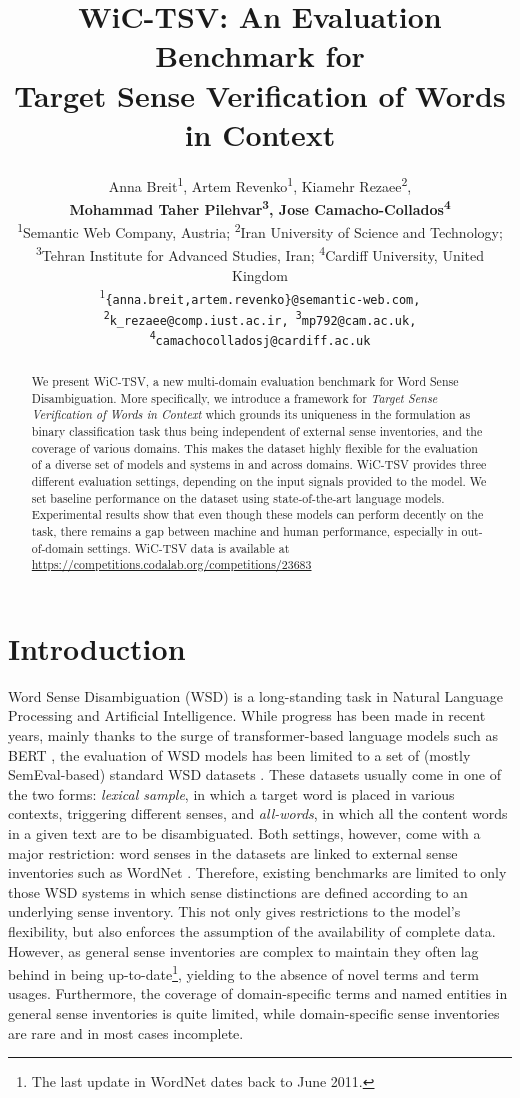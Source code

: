 \documentclass[11pt,a4paper]{article}
\title{WiC-TSV: An Evaluation Benchmark for \\ Target Sense Verification of Words in Context}
\author{Anna Breit\textsuperscript{1}, Artem Revenko\textsuperscript{1}, Kiamehr Rezaee\textsuperscript{2}, \\ \textbf{Mohammad Taher Pilehvar\textsuperscript{3}, Jose Camacho-Collados\textsuperscript{4}} \\
\textsuperscript{1}Semantic Web Company, Austria;
        \textsuperscript{2}Iran University of Science and Technology; \\ 
        \textsuperscript{3}Tehran Institute for Advanced Studies, Iran; 
        \textsuperscript{4}Cardiff University, United Kingdom \\ 
        \textsuperscript{1}\tt \{anna.breit,artem.revenko\}@semantic-web.com,
        \\ \textsuperscript{2}\tt k\_rezaee@comp.iust.ac.ir, \textsuperscript{3}\tt mp792@cam.ac.uk, \\ \textsuperscript{4}\tt camachocolladosj@cardiff.ac.uk}
\date{}
\begin{document}
\maketitle
\begin{abstract}
We present WiC-TSV, a new multi-domain evaluation benchmark for Word Sense Disambiguation. 
More specifically, we introduce a framework for \textit{Target Sense Verification of Words in Context} which grounds its uniqueness in the formulation as binary classification task thus being independent of external sense inventories, and the coverage of various domains.
This makes the dataset highly flexible for the evaluation of a diverse set of models and systems in and across domains. 
WiC-TSV provides three different evaluation settings, depending on the input signals provided to the model.
We set baseline performance on the dataset using state-of-the-art language models.
Experimental results show that even though these models can perform decently on the task, there remains a gap between machine and human performance, especially in out-of-domain settings. WiC-TSV data is available at  \url{https://competitions.codalab.org/competitions/23683}
\end{abstract}


\section{Introduction}
\label{introduction}

Word Sense Disambiguation (WSD) is a long-standing task in Natural Language Processing and Artificial Intelligence. While progress has been made in recent years, mainly thanks to the surge of transformer-based language models such as BERT \cite{loureiro-jorge-2019-language,vial2019sensecompresswsd,huang-etal-2019-glossbert}, the evaluation of WSD models has been limited to a set of (mostly SemEval-based) standard WSD datasets \cite{raganato-camachocollados-navigli:2017:EACLlong}. 
These datasets usually come in one of the two forms: \textit{lexical sample}, in which a target word is placed in various contexts, triggering different senses, and \textit{all-words}, in which all the content words in a given text are to be disambiguated.
Both settings, however, come with a major restriction: word senses in the datasets are linked to external sense inventories such as WordNet \cite{Fellbaum:98}.
Therefore, existing benchmarks are limited to only those WSD systems in which sense distinctions are defined according to an underlying sense inventory.
This not only gives restrictions to the model's flexibility, 
but also enforces the assumption of the availability of complete data.
However, as general sense inventories are complex to maintain they often lag behind in being up-to-date\footnote{The last update in WordNet dates back to June 2011.}, yielding to the absence of novel terms and term usages. Furthermore, the coverage of domain-specific terms and named entities in general sense inventories is quite limited, while domain-specific sense inventories are rare and in most cases incomplete. 
\end{document}
